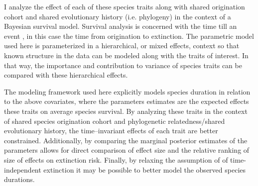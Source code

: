 \documentclass[12pt,letterpaper]{article}
\begin{document}
I analyze the effect of each of these species traits along with shared origination cohort and shared evolutionary history (i.e. phylogeny) in the context of a Bayesian survival model. Survival analysis is concerned with the time till an event \citep{Klein2003}, in this case the time from origination to extinction. The parametric model used here is parameterized in a hierarchical, or mixed effects, context so that known structure in the data can be modeled along with the traits of interest. In that way, the importance and contribution to variance of species traits can be compared with these hierarchical effects.

The modeling framework used here explicitly models species duration in relation to the above covariates, where the parameters estimates are the expected effects these traits on average species survival. By analyzing these traits in the context of shared species origination cohort and phylogenetic relatedness/shared evolutionary history, the time--invariant effects of each trait are better constrained. Additionally, by comparing the marginal posterior estimates of the parameters allows for direct comparison of effect size and the relative ranking of size of effects on extinction risk. Finally, by relaxing the assumption of of time-independent extinction it may be possible to better model the observed species durations. 
\end{document}
